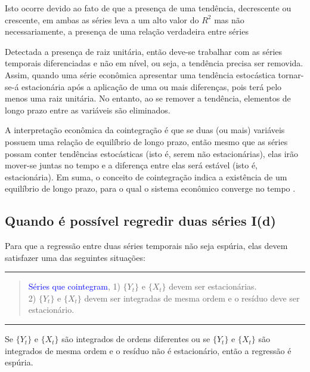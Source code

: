\documentclass[
]{book}
\theoremstyle{definition}
\theoremstyle{definition}
\theoremstyle{definition}
\theoremstyle{remark}
\begin{document}
Isto ocorre devido ao fato de que a presença de uma tendência, decrescente ou crescente, em ambas as séries leva a um alto valor do \(R^2\) mas não necessariamente, a presença de uma relação verdadeira entre séries \citep{gujarati2003}

Detectada a presença de raiz unitária, então deve-se trabalhar com as séries temporais diferenciadas e não em nível, ou seja, a tendência precisa ser removida. Assim, quando uma série econômica apresentar uma tendência estocástica tornar-se-á estacionária após a aplicação de uma ou mais diferenças, pois terá pelo menos uma raiz unitária. No entanto, ao se remover a tendência, elementos de longo prazo entre as variáveis são eliminados.

A interpretação econômica da cointegração é que se duas (ou mais) variáveis possuem uma relação de equilíbrio de longo prazo, então mesmo que as séries possam conter tendências estocásticas (isto é, serem não estacionárias), elas irão mover-se juntas no tempo e a diferença entre elas será estável (isto é, estacionária). Em suma, o conceito de cointegração indica a existência de um equilíbrio de longo prazo, para o
qual o sistema econômico converge no tempo \citep{harris1995}.

\hypertarget{quando-uxe9-possuxedvel-regredir-duas-suxe9ries-id}{%
\subsection{Quando é possível regredir duas séries I(d)}\label{quando-uxe9-possuxedvel-regredir-duas-suxe9ries-id}}

Para que a regressão entre duas séries temporais não seja espúria, elas devem satisfazer uma das seguintes situações:

\begin{center}\rule{0.5\linewidth}{0.5pt}\end{center}

\begin{quote}
\textcolor{blue}{Séries que cointegram},
1) \(\{Y_t\}\) e \(\{X_t\}\) devem ser estacionárias.\\
2) \(\{Y_t\}\) e \(\{X_t\}\) devem ser integradas de mesma ordem e o resíduo deve ser estacionário.
\end{quote}

\begin{center}\rule{0.5\linewidth}{0.5pt}\end{center}

Se \(\{Y_t\}\) e \(\{X_t\}\) são integrados de ordens diferentes ou se \(\{Y_t\}\) e \(\{X_t\}\) são integrados de mesma ordem e o resíduo não é estacionário, então a regressão é espúria.
\end{document}
